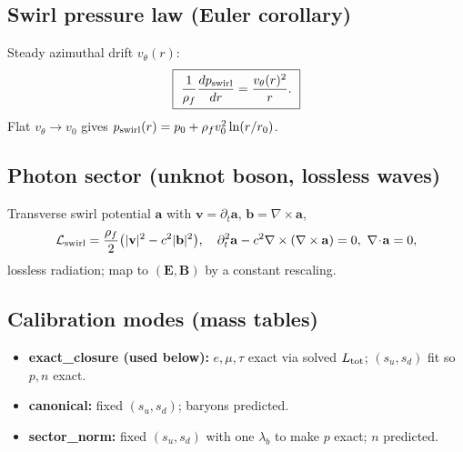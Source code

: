 \documentclass[11pt]{article}
\begin{document}
    \subsection*{Swirl pressure law (Euler corollary)}
        Steady azimuthal drift $v_\theta(r)$:
        \[
            \boxed{~
            \frac{1}{\rho_f}\frac{dp_{\rm swirl}}{dr}=\frac{v_\theta(r)^2}{r}.
            ~}
        \]
        Flat $v_\theta\to v_0$ gives $p_{\rm swirl}(r)=p_0+\rho_f v_0^2\ln(r/r_0)$.

    \subsection*{Photon sector (unknot boson, lossless waves)}
        Transverse swirl potential $\mathbf a$ with $\mathbf v=\partial_t\mathbf a$, $\mathbf b=\nabla\times\mathbf a$,
        \[
            \mathcal L_{\rm swirl}=\frac{\rho_f}{2}\big(|\mathbf v|^2-c^2|\mathbf b|^2\big),\quad
            \partial_t^2\mathbf a-c^2\nabla\times(\nabla\times\mathbf a)=0,\ \nabla\!\cdot\!\mathbf a=0,
        \]
        lossless radiation; map to $(\mathbf E,\mathbf B)$ by a constant rescaling.

    \subsection*{Calibration modes (mass tables)}
        \begin{itemize}
        \item \textbf{exact\_closure (used below):} $e,\mu,\tau$ exact via solved $L_{\rm tot}$; $(s_u,s_d)$ fit so $p,n$ exact.
        \item \textbf{canonical:} fixed $(s_u,s_d)$; baryons predicted.
        \item \textbf{sector\_norm:} fixed $(s_u,s_d)$ with one $\lambda_b$ to make $p$ exact; $n$ predicted.
        \end{itemize}
\end{document}
